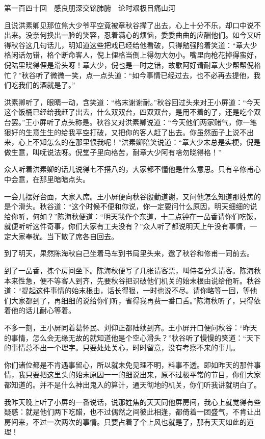 \documentclass[12pt,UTF8]{ctexbook}
\begin{document}
{{{第一百四十回　感良朋深交铭肺腑　论时艰极目痛山河





且说洪素卿见那位焦大少爷平空竟被章秋谷撵了出去，心上十分不乐，却口中说不出来。没奈何换出一脸的笑容，忍着满心的烦恼，委委曲曲的应酬他们。如今又听得秋谷这几句话儿，明知道这些把戏已经给他看破，只得勉强陪着笑道：“章大少格闲话勿错，格个断命客人，倪上俚格当倒上得勿大勿小。嘴里向枪花掉得蛮好，倪陆里晓得俚是滑头呀！章大少，倪也是一时之错，故歇阿好请耐章大少帮帮倪格忙？”秋谷听了微微一笑，点一点头道：“如今事情已经过去，也不必再去提他，我们吃我们的酒就是了。”

洪素卿听了，眼睛一动，含笑道：“格末谢谢耐。”秋谷回过头来对王小屏道：“今天这个饭桶已经给我赶了出去，什么双双台，四双双台，是用不着的了，还是吃个双台罢。”王小屏听了点头称是。秋谷又对洪素卿说道：“今天他们两家赌气，你一笔狠好的生意生生的给我平空打破，又把你的客人赶了出去。你虽然面子上说不出来，心上不知怎么的在那里恨我呢！”洪素卿陪笑说道：“章大少末总是实梗，倪是做生意，叫呒说法呀。倪堂子里向格苦，耐章大少阿有啥勿晓得格！”

众人听着洪素卿的话儿说得七不搭八的，大家都不懂他是什么意思。只有辛修甫心中会意，在那里暗暗点头。

一会儿摆好台面，大家入席。王小屏便向秋谷殷勤道谢，又问他怎么知道那姓焦的是个滑头。秋谷道：“这个时候不便和你说，你一定要问什么原因，明天细细的说给你听，何如？”陈海秋便道：“明天我作个东道，十二点钟在一品香请你们吃饭，就便听听这件奇事，你们大家有工夫没有？”众人听了都说明天上午没有事情，一定大家奉扰。当下散了席各自回去。

到了明天，果然陈海秋自己坐着马车到书局里头来，邀了秋谷和修甫一同前去。

到了一品香，拣个房间坐下。陈海秋便写了几张请客票，叫侍者分头请客。陈海秋本来性急，便不等客人到齐，先要秋谷把识破他们机关的始末根由说给他听。秋谷道：“提起这件事情的始末根由，话长得狠，一时也说不尽。请你略等一回，等他们大家都到了，再细细的说给你们听，省得我再费一番口舌。”陈海秋听了，只得依着他的话儿耐心等着。

不多一刻，王小屏同着葛怀民、刘仰正都陆续到齐。王小屏开口便问秋谷：“昨天的事情，怎么会无缘无故的就知道他是个空心滑头？”秋谷听了慢慢的笑道：“天下的事情总不出一个理字。只要处处关心，时时留意，没有考察不来的事儿。

你们诸位都是不肯遇事留心，所以就未免见理不明，料事不透。即如昨天的那件事情，我只要把这里头的始末原因一一的细说出来，原不过极平常的节目，你们大家都知道的。并不是什么神出鬼入的算计，通天彻地的机关，你们听我讲就明白了。

我昨天晚上听了小屏的一番说话，说那姓焦的天天同他屏房间，我心上就觉得有些疑惑：就是他们两下吃醋，也不过偶然之间彼此相逢，都倚着一团盛气，不肯让出房间来，不过一次两次的事情。只要占着了个上风也就是了，那有天天如此的道理！

}}}
\end{document}
